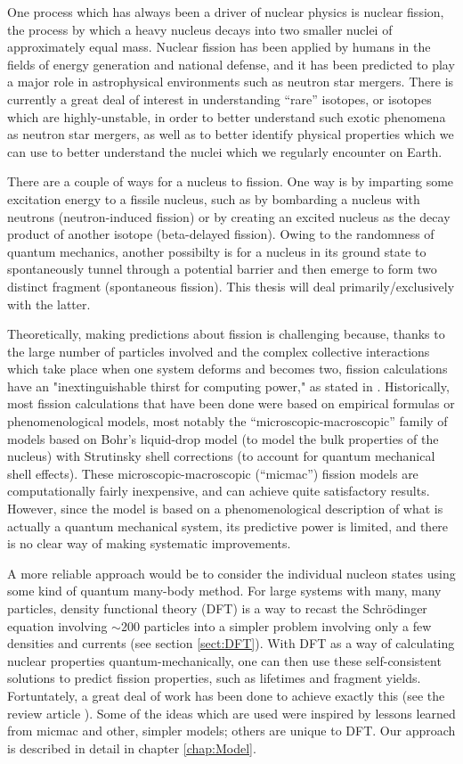 One process which has always been a driver of nuclear physics is nuclear fission, the process by which a heavy nucleus decays into two smaller nuclei of approximately equal mass. Nuclear fission has been applied by humans in the fields of energy generation and national defense, and it has been predicted to play a major role in astrophysical environments such as neutron star mergers. There is currently a great deal of interest in understanding ``rare'' isotopes, or isotopes which are highly-unstable, in order to better understand such exotic phenomena as neutron star mergers, as well as to better identify physical properties which we can use to better understand the nuclei which we regularly encounter on Earth.

There are  a couple of ways for a nucleus to fission. One way is by imparting some excitation energy to a fissile nucleus, such as by bombarding a nucleus with neutrons (neutron-induced fission) or by creating an excited nucleus as the decay product of another isotope (beta-delayed fission). Owing to the randomness of quantum mechanics, another possibilty is for a nucleus in its ground state to spontaneously tunnel through a potential barrier and then emerge to form two distinct fragment (spontaneous fission). This thesis will deal primarily/exclusively with the latter.

Theoretically, making predictions about fission is challenging because, thanks to the large number of particles involved and the complex collective interactions which take place when one system deforms and becomes two, fission calculations have an "inextinguishable thirst for computing power," as stated in \cite{Schunck2016-review}. Historically, most fission calculations that have been done were based on empirical formulas or phenomenological models, most notably the ``microscopic-macroscopic'' family of models based on Bohr's liquid-drop model (to model the bulk properties of the nucleus) with Strutinsky shell corrections (to account for quantum mechanical shell effects). These microscopic-macroscopic (``micmac'') fission models are computationally fairly inexpensive, and can achieve quite satisfactory results. However, since the model is based on a phenomenological description of what is actually a quantum mechanical system, its predictive power is limited, and there is no clear way of making systematic improvements.

A more reliable approach would be to consider the individual nucleon states using some kind of quantum many-body method. For large systems with many, many particles, density functional theory (DFT) is a way to recast the Schr\"{o}dinger equation involving $\sim$200 particles into a simpler problem involving only a few densities and currents (see section \ref{sect:DFT}). With DFT as a way of calculating nuclear properties quantum-mechanically, one can then use these self-consistent solutions to predict fission properties, such as lifetimes and fragment yields. Fortuntately, a great deal of work has been done to achieve exactly this (see the review article \cite{Schunck2016-review}). Some of the ideas which are used were inspired by lessons learned from micmac and other, simpler models; others are unique to DFT. Our approach is described in detail in chapter \ref{chap:Model}.

